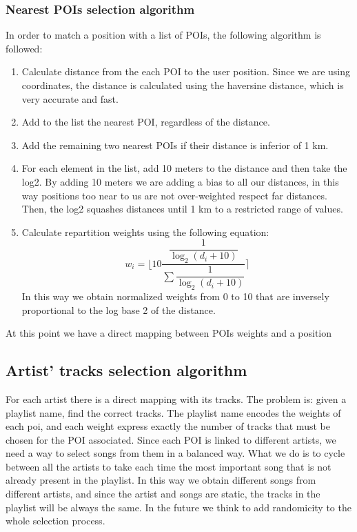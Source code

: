 \subsubsection{Nearest POIs selection algorithm}
In order to match a position with a list of POIs, the following algorithm is followed:
\begin{enumerate}
\item Calculate distance from the each POI to the user position. Since we are using coordinates, the distance is calculated using the haversine distance, which is very accurate and fast.
\item Add to the list the nearest POI, regardless of the distance.
\item Add the remaining two nearest POIs if their distance is inferior of 1 km.
\item For each element in the list, add 10 meters to the distance and then take the log2. By adding 10 meters we are adding a bias to all our distances, in this way positions too near to us are not over-weighted respect far distances. Then, the log2 squashes distances until 1 km to a restricted range of values.
\item Calculate repartition weights using the following equation:
$$w_i = \Bigg \lfloor 10 \dfrac{\dfrac{1}{\log_2 (d_i + 10)}}{\sum \dfrac{1}{\log_2 (d_i + 10)} } \Bigg \rceil$$
In this way we obtain normalized weights from 0 to 10 that are inversely proportional to the log base 2 of the distance. 
\end{enumerate}
At this point we have a direct mapping between POIs weights and a position
\subsection{Artist' tracks selection algorithm}
For each artist there is a direct mapping with its tracks.
The problem is: given a playlist name, find the correct tracks.
The playlist name encodes the weights of each poi, and each weight express exactly the number of tracks that must be chosen for the POI associated.
Since each POI is linked to different artists, we need a way to select songs from them in a balanced way.
What we do is to cycle between all the artists to take each time the most important song that is not already present in the playlist. In this way we obtain different songs from different artists, and since the artist and songs are static, the tracks in the playlist will be always the same. In the future we think to add randomicity to the whole selection process.

